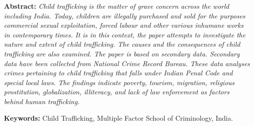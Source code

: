 \setcounter{figure}{0}
\setcounter{table}{0}
\setcounter{footnote}{0}

\label{2016-art5}

\vspace{-.3cm}




\begin{multicols}{2}

\noi
\textbf{Abstract:} {\it Child trafficking is the matter of grave concern across the world including India. Today, children are illegally purchased and sold for the purposes commercial sexual exploitation, forced labour and other various inhumane works in contemporary times. It is in this context, the paper attempts to investigate the nature and extent of child trafficking. The causes and the consequences of child trafficking are also examined. The paper is based on secondary data. Secondary data have been collected from National Crime Record Bureau. These data analyses crimes pertaining to child trafficking that falls under Indian Penal Code and special local laws. The findings indicate poverty, tourism, migration, religious prostitution, globalization, illiteracy, and lack of law enforcement as factors behind human trafficking.}

{\bf Keywords:} Child Trafficking,  Multiple Factor School of Criminology, India.


\end{multicols}
